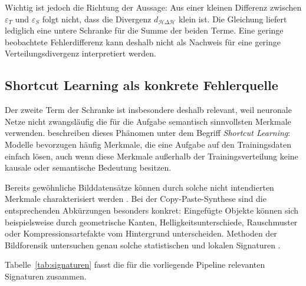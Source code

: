 Wichtig ist jedoch die Richtung der Aussage: Aus einer kleinen Differenz zwischen $\varepsilon_T$ und $\varepsilon_S$ folgt nicht, dass die Divergenz $d_{\mathcal{H}\Delta\mathcal{H}}$ klein ist. Die Gleichung liefert lediglich eine untere Schranke für die Summe der beiden Terme. Eine geringe beobachtete Fehlerdifferenz kann deshalb nicht als Nachweis für eine geringe Verteilungsdivergenz interpretiert werden.

\subsection{Shortcut Learning als konkrete Fehlerquelle}
\label{sec:shortcut}

Der zweite Term der Schranke ist insbesondere deshalb relevant, weil neuronale Netze nicht zwangsläufig die für die Aufgabe semantisch sinnvollsten Merkmale verwenden. \textcite{geirhos2020} beschreiben dieses Phänomen unter dem Begriff \emph{Shortcut Learning}: Modelle bevorzugen häufig Merkmale, die eine Aufgabe auf den Trainingsdaten einfach lösen, auch wenn diese Merkmale außerhalb der Trainingsverteilung keine kausale oder semantische Bedeutung besitzen.

Bereits gewöhnliche Bilddatensätze können durch solche nicht intendierten Merkmale charakterisiert werden \parencite{torralba2011}. Bei der Copy-Paste-Synthese sind die entsprechenden Abkürzungen besonders konkret: Eingefügte Objekte können sich beispielsweise durch geometrische Kanten, Helligkeitsunterschiede, Rauschmuster oder Kompressionsartefakte vom Hintergrund unterscheiden. Methoden der Bildforensik untersuchen genau solche statistischen und lokalen Signaturen \parencite{farid2009}.

Tabelle~\ref{tab:signaturen} fasst die für die vorliegende Pipeline relevanten Signaturen zusammen.

